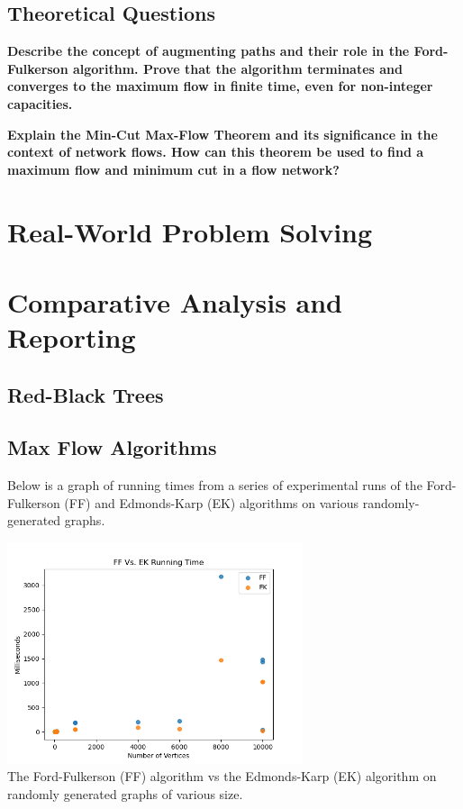 \documentclass[12pt]{amsart}
\begin{document}
\subsection{Theoretical Questions}

    \textbf{Describe the concept of augmenting paths and
    their role in the Ford-Fulkerson algorithm. Prove that the
    algorithm terminates and converges to the maximum flow in
    finite time, even for non-integer capacities.}

    \textbf{Explain the Min-Cut Max-Flow Theorem and its
    significance in the context of network flows. How can this
    theorem be used to find a maximum flow and minimum cut in a
    flow network?}

\section{Real-World Problem Solving}

\section{Comparative Analysis and Reporting}

\subsection{Red-Black Trees}

\subsection{Max Flow Algorithms}

    Below is a graph of running times from a series of
    experimental runs of the Ford-Fulkerson (FF) and
    Edmonds-Karp (EK) algorithms on various randomly-generated
    graphs.

\begin{center}
    \includegraphics[width=0.65\textwidth]{mf_algorithm_comparison} \\
    The Ford-Fulkerson (FF) algorithm vs the Edmonds-Karp (EK)
    algorithm on randomly generated graphs of various size. \\
    \vskip 1cm
\end{center}
\end{document}
